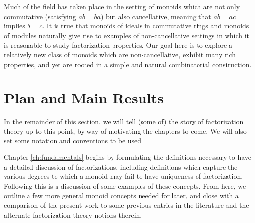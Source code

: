 
Much of the field has taken place in the setting of monoids which are not only commutative (satisfying $ab = ba$) but also cancellative, meaning that $ab = ac$ implies $b = c$.
It is true that monoids of ideals in commutative rings and monoids of modules naturally give rise to examples of non-cancellative settings in which it is reasonable to study factorization properties. 
Our goal here is to explore a relatively new class of monoids which are non-cancellative, exhibit many rich properties, and yet are rooted in a simple and natural combinatorial construction.


\section{Plan and Main Results}
In the remainder of this section, we will tell (some of) the story of factorization theory up to this point, by way of motivating the chapters to come.  
We will also set some notation and conventions to be used.

Chapter \ref{ch:fundamentals} begins by formulating the definitions necessary to have a detailed discussion of factorizations, including definitions which capture the various degrees to which a monoid may fail to have uniqueness of factorization.  
Following this is a discussion of some examples of these concepts.
From here, we outline a few more general monoid concepts needed for later, and close with a comparison of the present work to some previous entries in the literature and the alternate factorization theory notions therein.


